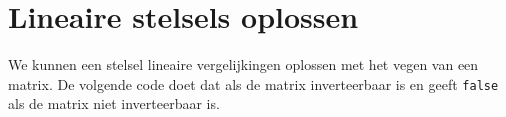 \documentclass[10pt,a4paper,titlepage]{article}
\begin{document}
\section{Lineaire stelsels oplossen}

We kunnen een stelsel lineaire vergelijkingen oplossen met het vegen van een matrix. De volgende code doet dat als de matrix inverteerbaar is en geeft \texttt{false} als de matrix niet inverteerbaar is.

\end{document}
